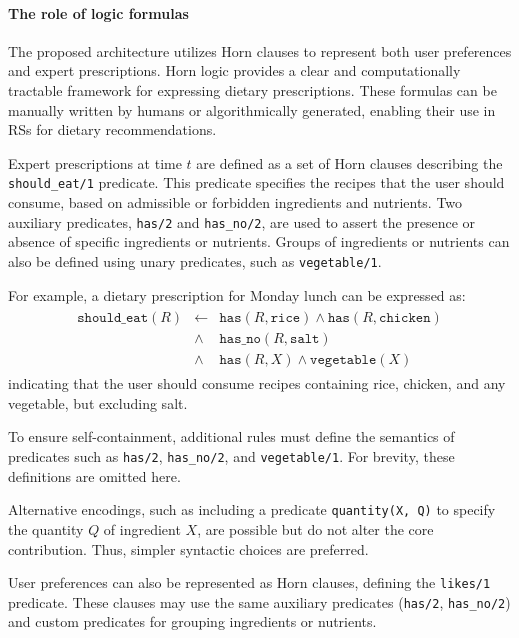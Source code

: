 \paragraph{The role of logic formulas}\label{par:the-role-of-logic-formulas}

The proposed architecture utilizes Horn clauses to represent both user preferences and expert prescriptions.
%
Horn logic provides a clear and computationally tractable framework for expressing dietary prescriptions.
%
These formulas can be manually written by humans or algorithmically generated, enabling their use in \glspl{RS} for dietary recommendations.

%
Expert prescriptions at time \( t \) are defined as a set of Horn clauses describing the \texttt{should\_eat/1} predicate.
%
This predicate specifies the recipes that the user should consume, based on admissible or forbidden ingredients and nutrients.
%
Two auxiliary predicates, \texttt{has/2} and \texttt{has\_no/2}, are used to assert the presence or absence of specific ingredients or nutrients.
%
Groups of ingredients or nutrients can also be defined using unary predicates, such as \texttt{vegetable/1}.

%
For example, a dietary prescription for Monday lunch can be expressed as:
%
\begin{align*}
  \begin{array}{rcl}
    \texttt{should\_eat}(R) &\leftarrow& \texttt{has}(R, \texttt{rice}) \land \texttt{has}(R, \texttt{chicken}) \\
                            &\land& \texttt{has\_no}(R, \texttt{salt}) \\
                            &\land& \texttt{has}(R, X) \land \texttt{vegetable}(X)
  \end{array}
\end{align*}
%
indicating that the user should consume recipes containing rice, chicken, and any vegetable, but excluding salt.

%
To ensure self-containment, additional rules must define the semantics of predicates such as \texttt{has/2}, \texttt{has\_no/2}, and \texttt{vegetable/1}.
%
For brevity, these definitions are omitted here.

%
Alternative encodings, such as including a predicate \texttt{quantity(X, Q)} to specify the quantity \( Q \) of ingredient \( X \), are possible but do not alter the core contribution.
%
Thus, simpler syntactic choices are preferred.

%
User preferences can also be represented as Horn clauses, defining the \texttt{likes/1} predicate.
%
These clauses may use the same auxiliary predicates (\texttt{has/2}, \texttt{has\_no/2}) and custom predicates for grouping ingredients or nutrients.

